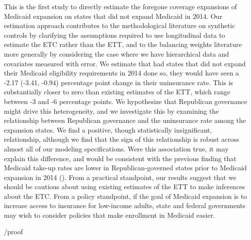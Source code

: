 \documentclass[aoas]{imsart}
\theoremstyle{plain}
\theoremstyle{remark}
\begin{document}
This is the first study to directly estimate the foregone coverage expansions of Medicaid expansion on states that did not expand Medicaid in 2014. Our estimation approach contributes to the methodological literature on synthetic controls by clarifying the assumptions required to use longitudinal data to estimate the ETC rather than the ETT, and to the balancing weights literature more generally by considering the case where we have hierarchical data and covariates measured with error. We estimate that had states that did not expand their Medicaid eligibility requirements in 2014 done so, they would have seen a -2.17 (-3.41, -0.94) percentage point change in their uninsurance rate. This is substantially closer to zero than existing estimates of the ETT, which range between -3 and -6 percentage points. We hypothesize that Republican governance might drive this heterogeneity, and we investigate this by examining the relationship between Republican governance and the uninsurance rate among the expansion states. We find a positive, though statistically insignificant, relationship, although we find that the sign of this relationship is robust across almost all of our modeling specifications. Were this association true, it may explain this difference, and would be consistent with the previous finding that Medicaid take-up rates are lower in Republican-governed states prior to Medicaid expansion in 2014 (\cite{sommers2012understanding}). From a practical standpoint, our results suggest that we should be cautious about using existing estimates of the ETT to make inferences about the ETC. From a policy standpoint, if the goal of Medicaid expansion is to increase access to insurance for low-income adults, state and federal governments may wish to consider policies that make enrollment in Medicaid easier.

\begin{appendix}

{/proof}







\end{appendix}
\end{document}
